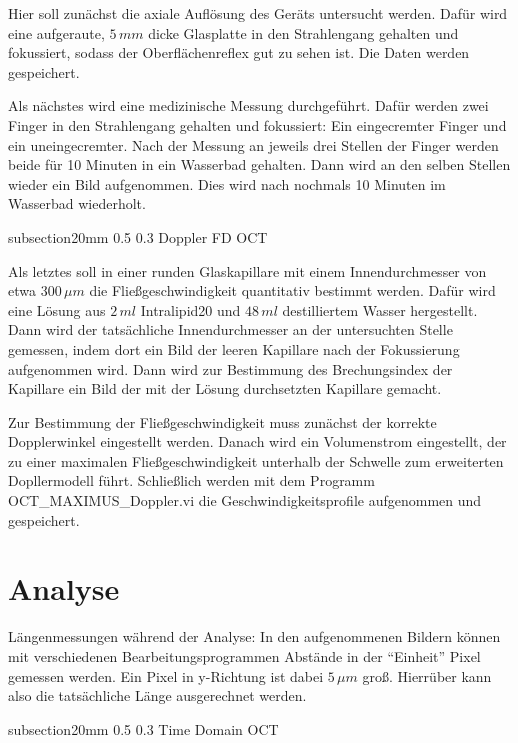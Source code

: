 \documentclass[german, %
parskip=full, %
bibliography=totoc, %
]{scrartcl}
\makeatletter
\renewcommand\subsection{\@startsection 
   {subsection}{2}{0mm}%
   {0.5\baselineskip}%
   {0.3\baselineskip}%
   {\bfseries\sffamily\large}%
   }
\makeatother
\begin{document}
Hier soll zunächst die axiale Auflösung des Geräts untersucht werden. Dafür wird eine aufgeraute, $5\,mm$ dicke Glasplatte in den Strahlengang gehalten und fokussiert, sodass der Oberflächenreflex gut zu sehen ist. Die Daten werden gespeichert.

Als nächstes wird eine medizinische Messung durchgeführt. Dafür werden zwei Finger in den Strahlengang gehalten und fokussiert: Ein eingecremter Finger und ein uneingecremter. Nach der Messung an jeweils drei Stellen der Finger werden beide für 10 Minuten in ein Wasserbad gehalten. Dann wird an den selben Stellen wieder ein Bild aufgenommen. Dies wird nach nochmals 10 Minuten im Wasserbad wiederholt.

\subsection{Doppler FD OCT}

Als letztes soll in einer runden Glaskapillare mit einem Innendurchmesser von etwa $300\, \mu m$ die Fließgeschwindigkeit quantitativ bestimmt werden. Dafür wird eine Lösung aus $2\,ml$ Intralipid20 und $48\,ml$ destilliertem Wasser hergestellt. Dann wird der tatsächliche Innendurchmesser an der untersuchten Stelle gemessen, indem dort ein Bild der leeren Kapillare nach der Fokussierung aufgenommen wird. Dann wird zur Bestimmung des Brechungsindex der Kapillare ein Bild der mit der Lösung durchsetzten Kapillare gemacht. 

Zur Bestimmung der Fließgeschwindigkeit muss zunächst der korrekte Dopplerwinkel eingestellt werden. Danach wird ein Volumenstrom eingestellt, der zu einer maximalen Fließgeschwindigkeit unterhalb der Schwelle zum erweiterten Dopllermodell führt. Schließlich werden mit dem Programm OCT\_MAXIMUS\_Doppler.vi die Geschwindigkeitsprofile aufgenommen und gespeichert. 

\section{Analyse}

Längenmessungen während der Analyse: In den aufgenommenen Bildern können mit verschiedenen Bearbeitungsprogrammen Abstände in der "`Einheit"' Pixel gemessen werden. Ein Pixel in y-Richtung ist dabei $5\, \mu m$ groß. Hierrüber kann also die tatsächliche Länge ausgerechnet werden.

\subsection{Time Domain OCT}
\end{document}
